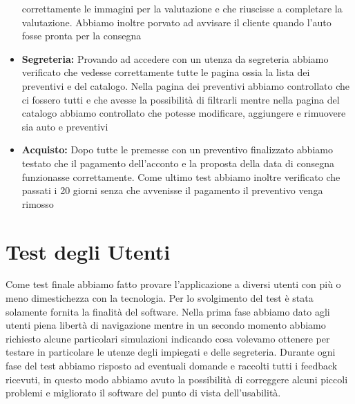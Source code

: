 \documentclass[a4paper, 11pt,oneside]{book}
\begin{document}
\begin{itemize}
            correttamente le immagini per la valutazione e che riuscisse a completare la valutazione. Abbiamo inoltre porvato ad avvisare il cliente quando l'auto fosse pronta per la consegna
            \item \textbf{Segreteria:} Provando ad accedere con un utenza da segreteria abbiamo verificato che vedesse correttamente tutte le pagina ossia la lista dei preventivi e del catalogo. Nella pagina dei preventivi abbiamo controllato che ci fossero tutti e che avesse la possibilità di filtrarli mentre
            nella pagina del catalogo abbiamo controllato che potesse modificare, aggiungere e rimuovere sia auto e preventivi
            \item \textbf{Acquisto:} Dopo tutte le premesse con un preventivo finalizzato abbiamo testato che il pagamento dell'acconto e la proposta della data di consegna funzionasse correttamente. Come ultimo test abbiamo inoltre verificato che passati i 20 giorni senza che avvenisse il pagamento il preventivo
            venga rimosso
        \end{itemize}
    \section{Test degli Utenti}
    Come test finale abbiamo fatto provare l'applicazione a diversi utenti con più o meno dimestichezza con la tecnologia. Per lo svolgimento del test è stata solamente fornita la finalità del software. Nella prima fase abbiamo dato agli utenti piena libertà di navigazione mentre in un secondo momento abbiamo richiesto
    alcune particolari simulazioni indicando cosa volevamo ottenere per testare in particolare le utenze degli impiegati e delle segreteria. Durante ogni fase del test abbiamo risposto ad eventuali domande e raccolti tutti i feedback ricevuti, in questo modo abbiamo avuto la possibilità di correggere alcuni piccoli problemi e migliorato
    il software del punto di vista dell'usabilità.


\end{document}
